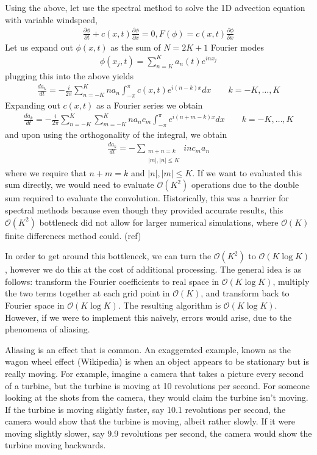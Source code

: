 Using the above, let use the spectral method to solve the 1D advection equation with variable windspeed,
\begin{align}
\frac{\partial\phi}{\partial t} + c(x,t)\frac{\partial \phi}{\partial x} =0, F(\phi) = c(x,t)\frac{\partial \phi}{\partial x}
\end{align}
Let us expand out $\phi(x,t)$ as the sum of $N=2K+1$ Fourier modes
\begin{align}
\phi(x_{j},t)= \sum_{n=K}^{K}a_{n}(t)e^{inx_{j}}
\end{align}
plugging this into the above yields
\begin{align}
\frac{d a_{k}}{dt} = -\frac{i}{2\pi}\sum_{n=-K}^{K}na_{n}\int_{-\pi}^{\pi}c(x,t)e^{i(n-k)x}dx \qquad k=-K,\ldots,K
\end{align}
Expanding out $c(x,t)$ as a Fourier series we obtain
\begin{align} 
\frac{d a_{k}}{dt} = -\frac{i}{2\pi}\sum_{n=-K}^{K}\sum_{m=-K}^{K}na_{n}c_{m}\int_{-\pi}^{\pi}e^{i(n+m-k)x}dx \qquad k=-K,\ldots,K
\end{align}
and upon using the orthogonality of the integral, we obtain
\begin{align}
\frac{da_{k}}{dt} = -\sum_{\substack{m+n=k\\ |m|,|n|\le K}} inc_{m}a_{n}
\end{align}
where we require that $n+m=k$ and $|n|,|m|\le K$. If we want to evaluated this sum directly, we would need to evaluate $\mathcal{O}(K^{2})$ operations due to the double sum required to evaluate the convolution. Historically, this was a barrier for spectral methods because even though they provided accurate results, this $\mathcal{O}(K^{2})$ bottleneck did not allow for larger numerical simulations, where $\mathcal{O}(K)$ finite differences method could. (ref)

In order to get around this bottleneck, we can turn the $\mathcal{O}(K^{2})$ to $\mathcal{O}(K\log K)$, however we do this at the cost of additional processing. The general idea is as follows: transform the Fourier coefficients to real space in $\mathcal{O}(K\log K)$, multiply the two terms together at each grid point in $\mathcal{O}(K)$, and transform back to Fourier space in $\mathcal{O}(K\log K)$. The resulting algorithm is $\mathcal{O}(K\log K)$. However, if we were to implement this naively, errors would arise, due to the phenomena of aliasing. 

Aliasing is an effect that is common. An exaggerated example, known as the wagon wheel effect (Wikipedia) is when an object appears to be stationary but is really moving. For example, imagine a camera that takes a picture every second of a turbine, but the turbine is moving at 10 revolutions per second. For someone looking at the shots from the camera, they would claim the turbine isn't moving. If the turbine is moving slightly faster, say 10.1 revolutions per second, the camera would show that the turbine is moving, albeit rather slowly. If it were moving slightly slower, say 9.9 revolutions per second, the camera would show the turbine moving backwards.


